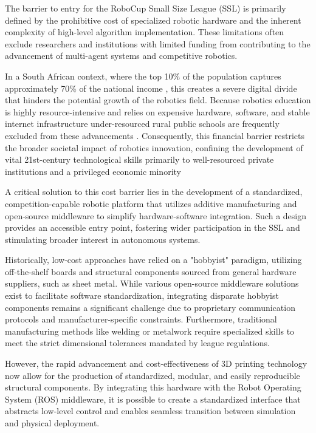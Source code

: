 \documentclass[a4paper,twoside,12pt]{report}
\begin{document}
The barrier to entry for the RoboCup Small Size League (SSL) is primarily defined by the prohibitive cost of specialized robotic hardware and the inherent complexity of high-level algorithm implementation. 
These limitations often exclude researchers and institutions with limited funding from contributing to the advancement of multi-agent systems and competitive robotics.

In a South African context, where the top 10\% of the population captures approximately 70\% of the national income \citep{czajka2026thirty}, 
this creates a severe digital divide that hinders the potential growth of the robotics field. 
Because robotics education is highly resource-intensive and relies on expensive hardware, software, 
and stable internet infrastructure under-resourced rural public schools are frequently excluded from these advancements \cite{mapheto2023teachers}. 
Consequently, this financial barrier restricts the broader societal impact of robotics innovation, 
confining the development of vital 21st-century technological skills primarily to well-resourced private institutions and a privileged economic minority

A critical solution to this cost barrier lies in the development of a standardized, competition-capable robotic platform that utilizes additive manufacturing and open-source middleware to simplify hardware-software integration. 
Such a design provides an accessible entry point, fostering wider participation in the SSL and stimulating broader interest in autonomous systems. 

Historically, low-cost approaches have relied on a "hobbyist" paradigm, utilizing off-the-shelf boards and structural components sourced from general hardware suppliers, such as sheet metal. 
While various open-source middleware solutions exist to facilitate software standardization, integrating disparate hobbyist components remains a significant challenge due to proprietary communication protocols and manufacturer-specific constraints. 
Furthermore, traditional manufacturing methods like welding or metalwork require specialized skills to meet the strict dimensional tolerances mandated by league regulations. 

However, the rapid advancement and cost-effectiveness of 3D printing technology now allow for the production of standardized, modular, and easily reproducible structural components. 
By integrating this hardware with the Robot Operating System (ROS) middleware, it is possible to create a standardized interface that abstracts low-level control and enables seamless transition between simulation and physical deployment.
\end{document}
